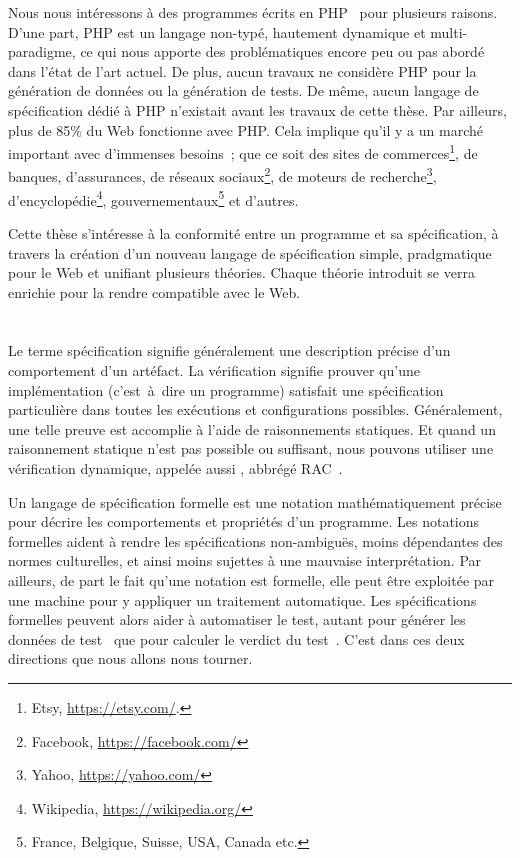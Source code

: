 Nous nous intéressons à des programmes écrits en PHP~ pour plusieurs
raisons. D'une part, PHP est un langage non-typé, hautement dynamique et
multi-paradigme, ce qui nous apporte des problématiques encore peu ou pas abordé
dans l'état de l'art actuel.  De plus, aucun travaux ne considère PHP pour la
génération de données ou la génération de tests. De même, aucun langage de
spécification dédié à PHP n'existait avant les travaux de cette thèse. Par
ailleurs, plus de 85\% du Web fonctionne avec PHP. Cela implique qu'il y a un
marché important avec d'immenses besoins~; que ce soit des sites de
commerces\footnote{Etsy, \url{https://etsy.com/}.}, de banques, d'assurances, de
réseaux sociaux\footnote{Facebook, \url{https://facebook.com/}}, de moteurs de
recherche\footnote{Yahoo, \url{https://yahoo.com/}},
d'encyclopédie\footnote{Wikipedia, \url{https://wikipedia.org/}},
gouvernementaux\footnote{France, Belgique, Suisse, USA, Canada etc.} et
d'autres.

Cette thèse s'intéresse à la conformité entre un programme et sa spécification,
à travers la création d'un nouveau langage de spécification simple, pradgmatique
pour le Web et unifiant plusieurs théories. Chaque théorie introduit se verra
enrichie pour la rendre compatible avec le Web.

\section{}
\label{section:sota:bisl}

Le terme {\strong spécification} signifie généralement une description précise
d'un comportement d'un artéfact. La {\strong vérification} signifie prouver
qu'une implémentation (c'est~à~dire un programme) satisfait une spécification
particulière dans toutes les exécutions et configurations possibles.
Généralement, une telle preuve est accomplie à l'aide de raisonnements
statiques. Et quand un raisonnement statique n'est pas possible ou suffisant,
nous pouvons utiliser une vérification dynamique, appelée aussi
, abbrégé RAC~.

Un {\strong langage de spécification} formelle est une notation mathématiquement
précise pour décrire les comportements et propriétés d'un programme. Les
{\strong notations formelles} aident à rendre les spécifications non-ambiguës,
moins dépendantes des normes culturelles, et ainsi moins sujettes à une mauvaise
interprétation. Par ailleurs, de part le fait qu'une notation est formelle, elle
peut être exploitée par une machine pour y appliquer un traitement automatique.
Les spécifications formelles peuvent alors aider à {\strong automatiser le
test}, autant pour générer les données de test~ que pour calculer le verdict du test~.
C'est dans ces deux directions que nous allons nous tourner.


